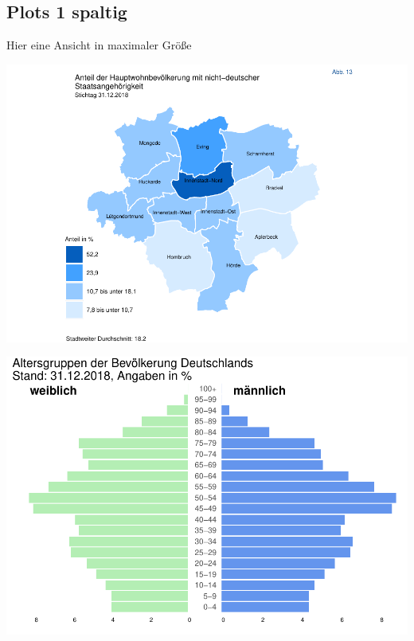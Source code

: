 \documentclass[
  a4paper,
  twoside]{article}
\begin{document}
\newpage

\hypertarget{plots-1-spaltig}{%
\subsection{Plots 1 spaltig}\label{plots-1-spaltig}}

Hier eine Ansicht in maximaler Größe

\includegraphics[width=1\linewidth]{2021-03-02_Beispiel_files/figure-latex/Plot map 1 spaltig-1}

\vspace{5mm}

\includegraphics[width=1\linewidth]{2021-03-02_Beispiel_files/figure-latex/plot Pyramide 1 spaltig-1}

\newpage
\end{document}
